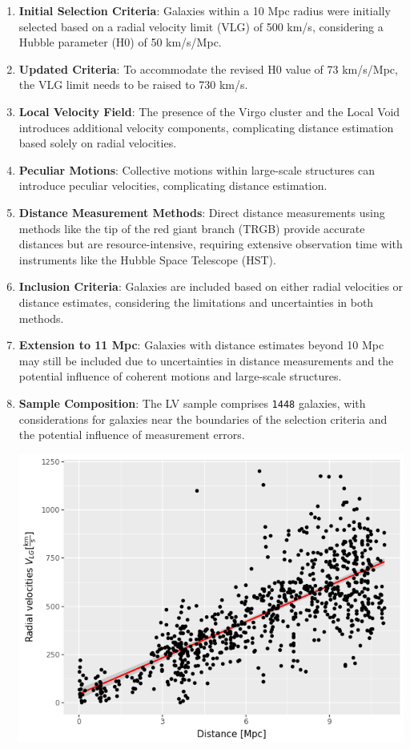 \documentclass[a4paper]{article}
\begin{document}
\begin{enumerate}
\item \textbf{Initial Selection Criteria}: Galaxies within a 10 Mpc radius were initially selected based on a radial velocity limit (VLG) of 500 km/s, considering a Hubble parameter (H0) of 50 km/s/Mpc.

\item \textbf{Updated Criteria}: To accommodate the revised H0 value of 73 km/s/Mpc, the VLG limit needs to be raised to 730 km/s.

\item \textbf{Local Velocity Field}: The presence of the Virgo cluster and the Local Void introduces additional velocity components, complicating distance estimation based solely on radial velocities.

\item \textbf{Peculiar Motions}: Collective motions within large-scale structures can introduce peculiar velocities, complicating distance estimation.

\item \textbf{Distance Measurement Methods}: Direct distance measurements using methods like the tip of the red giant branch (TRGB) provide accurate distances but are resource-intensive, requiring extensive observation time with instruments like the Hubble Space Telescope (HST).

\item \textbf{Inclusion Criteria}: Galaxies are included based on either radial velocities or distance estimates, considering the limitations and uncertainties in both methods.

\item \textbf{Extension to 11 Mpc}: Galaxies with distance estimates beyond 10 Mpc may still be included due to uncertainties in distance measurements and the potential influence of coherent motions and large-scale structures.

\item \textbf{Sample Composition}: The LV sample comprises \texttt{1448} galaxies, with considerations for galaxies near the boundaries of the selection criteria and the potential influence of measurement errors.

\begin{center}
\includegraphics[width=.9\linewidth]{figure/hubble.png}
\end{center}
\end{enumerate}
\end{document}
